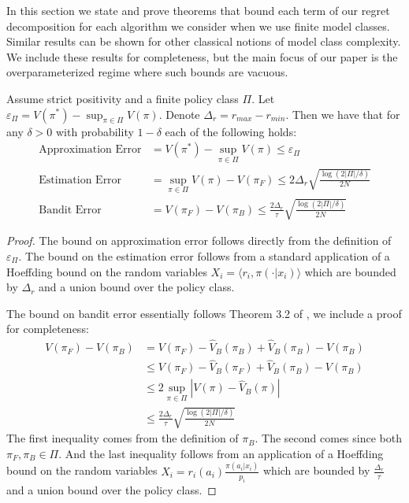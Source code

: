\label{app:small}


In this section we state and prove theorems that bound each term of our regret decomposition for each algorithm we consider when we use finite model classes. Similar results can be shown for other classical notions of model class complexity. We include these results for completeness, but the main focus of our paper is the overparameterized regime where such bounds are vacuous.


\begin{theorem}\label{thm:pol-small}
Assume strict positivity and a finite policy class $ \Pi$. Let $ \varepsilon_\Pi = V(\pi^*) - \sup_{\pi \in \Pi} V(\pi)$. Denote $ \Delta_r = r_{max} - r_{min}$. Then we have that for any $ \delta > 0$ with probability $ 1- \delta$ each of the following holds:
\begin{align*}
    \text{Approximation Error} &= V(\pi^*) - \sup_{\pi\in \Pi}V(\pi) \leq \varepsilon_\Pi\\
    \text{Estimation Error}  &= \sup_{\pi\in \Pi}V(\pi) - V(\pi_F) \leq 2\Delta_r \sqrt{\frac{\log(2|\Pi|/\delta)}{2N}}\\
    \text{Bandit Error}  &= V(\pi_F) - V(\pi_B) \leq \frac{2\Delta_r}{\tau} \sqrt{\frac{\log(2|\Pi|/\delta)}{2N}}
\end{align*}
\end{theorem}
\begin{proof}
The bound on approximation error follows directly from the definition of $ \varepsilon_\Pi$. The bound on the estimation error follows from a standard application of a Hoeffding bound on the random variables $ X_i = \langle r_i, \pi(\cdot|x_i)\rangle
$ which are bounded by $ \Delta_r$ and a union bound over the policy class.

The bound on bandit error essentially follows Theorem 3.2 of \cite{strehl2010learning}, we include a proof for completeness:
\begin{align*}
    V(\pi_F) - V(\pi_B) &= V(\pi_F) - \hat V_B(\pi_B) + \hat V_B(\pi_B) - V(\pi_B) \\
    &\leq V(\pi_F) - \hat V_B(\pi_F) + \hat V_B(\pi_B) - V(\pi_B)\\
    &\leq 2 \sup_{\pi \in \Pi} |V(\pi) - \hat V_B(\pi)|\\
    &\leq \frac{2\Delta_r}{\tau} \sqrt{\frac{\log(2|\Pi|/\delta)}{2N}}
\end{align*}
The first inequality comes from the definition of $ \pi_B$. The second comes since both $ \pi_F, \pi_B \in \Pi$.
And the last inequality follows from an application of a Hoeffding bound on the random variables $ X_i = r_i(a_i)\frac{\pi(a_i|x_i)}{p_i}$ which are bounded by $ \frac{\Delta_r}{\tau}$ and a union bound over the policy class.
\end{proof}

